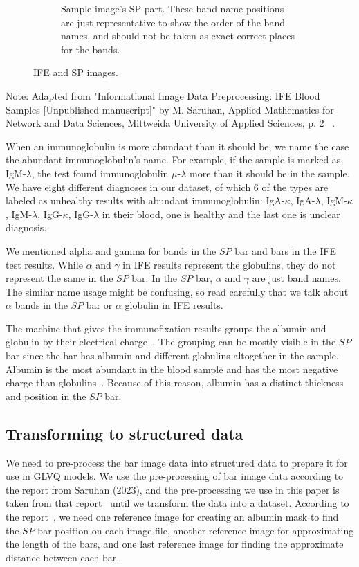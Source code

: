 \begin{figure}[H]
\begin{subfigure}[t]{0.40\textwidth}
\caption{Sample image's SP part. These band name positions are just representative to show the order of the band names, and should not be taken as exact correct places for the bands.}
\label{SP}
\end{subfigure}

\caption{IFE and SP images.}
\end{figure}

\noindent Note: Adapted from "Informational Image Data Preprocessing: IFE Blood Samples
[Unpublished manuscript]" by M. Saruhan, Applied Mathematics for Network and Data Sciences,
Mittweida University of Applied Sciences, p. 2 ~\cite{mypap}.
\vspace{10pt}

When an immunoglobulin is more abundant than it should be, we name the case the abundant immunoglobulin’s name. For example, if the sample is marked as IgM-$\lambda$, the test found immunoglobulin $\mu$-$\lambda$ more than it should be in the sample. We have eight different diagnoses in our dataset, of which 6 of the types are labeled as unhealthy results with abundant immunoglobulin: IgA-$\kappa$, IgA-$\lambda$, IgM-$\kappa$, IgM-$\lambda$, IgG-$\kappa$, IgG-$\lambda$ in their blood, one is healthy and the last one is unclear diagnosis.

We mentioned alpha and gamma for bands in the $SP$ bar and bars in the IFE test results. While $\alpha$ and $\gamma$ in IFE results represent the globulins, they do not represent the same in the $SP$ bar. In the $SP$ bar, $\alpha$ and $\gamma$ are just band names. The similar name usage might be confusing, so read carefully that we talk about $\alpha$ bands in the $SP$ bar or $\alpha$ globulin in IFE results.

The machine that gives the immunofixation results groups the albumin and globulin by their electrical charge~\cite{eclinpath}. The grouping can be mostly visible in the $SP$ bar since the bar has albumin and different globulins altogether in the sample. Albumin is the most abundant in the blood sample and has the most negative charge than globulins~\cite{leung}. Because of this reason, albumin has a distinct thickness and position in the $SP$ bar.

\subsection{Transforming to structured data}

We need to pre-process the bar image data into structured data to prepare it for use in GLVQ models. We use the pre-processing of bar image data according to the report from Saruhan (2023), and the pre-processing we use in this paper is taken from that report~\cite{mypap} until we transform the data into a dataset. According to the report~\cite{mypap}, we need one reference image for creating an albumin mask to find the $SP$ bar position on each image file, another reference image for approximating the length of the bars, and one last reference image for finding the approximate distance between each bar.

